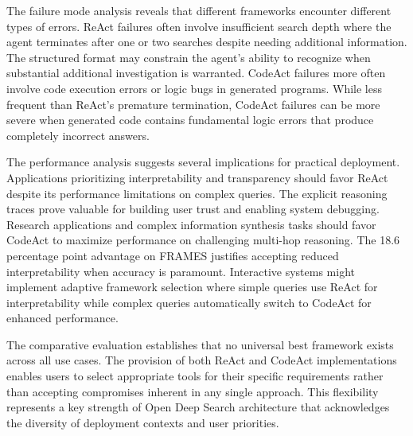 The failure mode analysis reveals that different frameworks encounter different types of errors. ReAct failures often involve insufficient search depth where the agent terminates after one or two searches despite needing additional information. The structured format may constrain the agent's ability to recognize when substantial additional investigation is warranted. CodeAct failures more often involve code execution errors or logic bugs in generated programs. While less frequent than ReAct's premature termination, CodeAct failures can be more severe when generated code contains fundamental logic errors that produce completely incorrect answers.

The performance analysis suggests several implications for practical deployment. Applications prioritizing interpretability and transparency should favor ReAct despite its performance limitations on complex queries. The explicit reasoning traces prove valuable for building user trust and enabling system debugging. Research applications and complex information synthesis tasks should favor CodeAct to maximize performance on challenging multi-hop reasoning. The 18.6 percentage point advantage on FRAMES justifies accepting reduced interpretability when accuracy is paramount. Interactive systems might implement adaptive framework selection where simple queries use ReAct for interpretability while complex queries automatically switch to CodeAct for enhanced performance.

The comparative evaluation establishes that no universal best framework exists across all use cases. The provision of both ReAct and CodeAct implementations enables users to select appropriate tools for their specific requirements rather than accepting compromises inherent in any single approach. This flexibility represents a key strength of Open Deep Search architecture that acknowledges the diversity of deployment contexts and user priorities.

